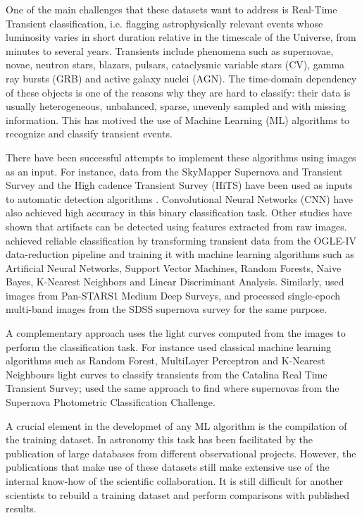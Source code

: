 \documentclass[a4paper,fleqn,usenatbib]{mnras}
\begin{document}
One of the main challenges that these datasets want to address is
Real-Time Transient classification, i.e. flagging astrophysically
relevant events whose luminosity varies in short duration relative in
the timescale of the Universe, from minutes to several years.  
Transients include phenomena such as supernovae, novae, neutron
stars, blazars, pulsars, cataclysmic variable stars (CV), gamma ray
bursts (GRB) and active galaxy nuclei (AGN). 
The time-domain dependency of these objects is one of the reasons why
they are hard to classify: their data is usually heterogeneous,
unbalanced, sparse, unevenly sampled and with missing information. 
This has motived the use of Machine Learning (ML) algorithms to recognize
and classify transient events. 


There have been successful attempts to implement these algorithms
using images as an input.
For instance, data from the SkyMapper Supernova and Transient
Survey and the High cadence Transient Survey (HiTS) have been used as
inputs to automatic detection algorithms \citep{1708.08947,1701.00458}.
Convolutional Neural Networks (CNN) have also achieved
high accuracy in this binary classification task.
Other studies have shown that artifacts can be detected using
features extracted from raw images. 
\cite{1601.06320} achieved reliable
classification by transforming transient data from the OGLE-IV
data-reduction pipeline and training it with machine learning
algorithms such as Artificial Neural Networks, Support Vector
Machines, Random Forests, Naive Bayes, K-Nearest Neighbors and Linear
Discriminant Analysis.  
Similarly, \cite{1501.05470} used images from Pan-STARS1 Medium Deep
Surveys, and \cite{1407.4118} processed single-epoch multi-band images
from the SDSS supernova survey for the same purpose.  


A complementary approach uses the light curves computed from the
images to perform the classification task.
For instance \cite{1601.03931} used classical machine learning
algorithms such as Random Forest, MultiLayer Perceptron and K-Nearest Neighbours
light curves to classify transients from the Catalina Real Time
Transient Survey; \cite{1603.00882} used the same approach to find
where supernovas from the Supernova Photometric Classification
Challenge.

A crucial element in the developmet of any ML algorithm is the
compilation of the training dataset. 
In astronomy this task has been facilitated by the publication of
large databases from different observational projects. 
However, the publications that make use of these datasets still make
extensive use of the internal know-how of the scientific
collaboration. 
It is still difficult for another scientists to rebuild a training
dataset and perform comparisons with published results.
\end{document}
